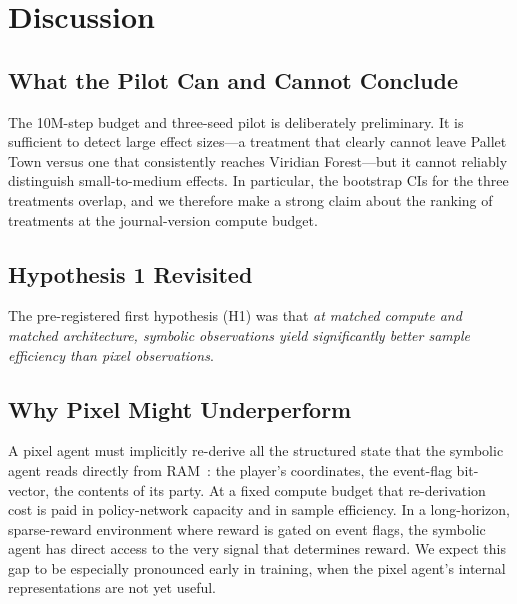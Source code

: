 \section{Discussion}
\label{sec:discussion}

\subsection{What the Pilot Can and Cannot Conclude}


The 10M-step budget and three-seed pilot is deliberately preliminary.
It is sufficient to detect large effect sizes---a treatment that
clearly cannot leave Pallet Town versus one that consistently reaches
Viridian Forest---but it cannot reliably distinguish small-to-medium
effects.  In particular, the bootstrap CIs for the three treatments
 overlap, and we therefore 
make a strong claim about the ranking of treatments at the
journal-version compute budget.

\subsection{Hypothesis 1 Revisited}
\label{sec:h1}

The pre-registered first hypothesis (H1) was that \emph{at matched
compute and matched architecture, symbolic observations yield
significantly better sample efficiency than pixel observations}.


\subsection{Why Pixel Might Underperform}

A pixel agent must implicitly re-derive all the structured state that
the symbolic agent reads directly from
RAM~\citep{anand2019unsupervised}: the player's coordinates, the
event-flag bit-vector, the contents of its party.  At a fixed compute
budget that re-derivation cost is paid in policy-network capacity and
in sample efficiency.  In a long-horizon, sparse-reward environment
where reward is gated on event flags, the symbolic agent has direct
access to the very signal that determines reward.  We expect this gap
to be especially pronounced early in training, when the pixel agent's
internal representations are not yet useful.

